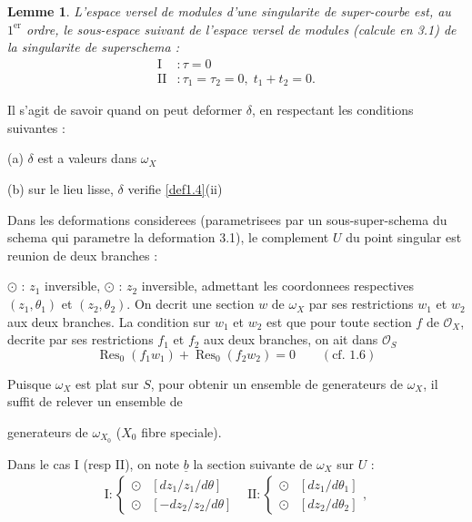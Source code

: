 \documentclass[11pt,a4paper]{article}
\theoremstyle{plain}
\newtheorem{lemma}[theorem]{Lemme}
\theoremstyle{definition}
\DeclareMathOperator{\Res}{Res}
\begin{document}
\begin{lemma}\label{lem3.3}
L'espace versel de modules d'une singularite de super-courbe est, au $1^{\text{er}}$ ordre, le sous-espace suivant de l'espace versel de modules (calcule en 3.1) de la singularite de superschema :
\[
\begin{aligned}
\text{I} &: \tau = 0 \\
\text{II} &: \tau_1 = \tau_2 = 0, \; t_1 + t_2 = 0.
\end{aligned}
\]
\end{lemma}

Il s'agit de savoir quand on peut deformer $\delta$, en respectant les conditions suivantes :

(a) $\delta$ est a valeurs dans $\omega_X$

(b) sur le lieu lisse, $\delta$ verifie \ref{def1.4}(ii)

Dans les deformations considerees (parametrisees par un sous-super-schema du schema qui parametre la deformation 3.1), le complement $U$ du point singular est reunion de deux branches :

$\odot$ : $z_1$ inversible, $\odot$ : $z_2$ inversible, admettant les coordonnees respectives $(z_1, \theta_1)$ et $(z_2, \theta_2)$. On decrit une section $w$ de $\omega_X$ par ses restrictions $w_1$ et $w_2$ aux deux branches. La condition sur $w_1$ et $w_2$ est que pour toute section $f$ de $\mathcal{O}_X$, decrite par ses restrictions $f_1$ et $f_2$ aux deux branches, on ait dans $\mathcal{O}_S$
\[
\Res_0(f_1 w_1) + \Res_0(f_2 w_2) = 0 \qquad (\text{cf. 1.6})
\]

Puisque $\omega_X$ est plat sur $S$, pour obtenir un ensemble de generateurs de $\omega_X$, il suffit de relever un ensemble de

\newpage

generateurs de $\omega_{X_0}$ ($X_0$ fibre speciale).

Dans le cas I (resp II), on note $\underline{b}$ la section suivante de $\omega_X$ sur $U$ :
\[
\begin{array}{ll}
\text{I} : \begin{cases} \odot & [dz_1/z_1 / d\theta] \\ \odot & [-dz_2/z_2 / d\theta] \end{cases} &
\text{II} : \begin{cases} \odot & [dz_1/d\theta_1] \\ \odot & [dz_2/d\theta_2] \end{cases},
\end{array}
\]
\end{document}
